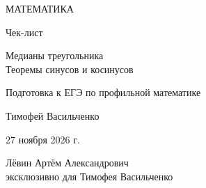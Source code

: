 \documentclass[a4paper,12pt]{article}
\begin{document}
\begin{titlepage}
\centering
\vspace*{27mm}
{\Large\color{darkaccent} МАТЕМАТИКА\par}
\vspace{14mm}
{\LARGE Чек-лист\par}
\vspace{10mm}
{\LARGE\color{accent} Медианы треугольника\\[3pt]Теоремы синусов и косинусов\par}
\vspace{15mm}
{\large Подготовка к ЕГЭ по профильной математике\par}
\vfill
{\large Тимофей Васильченко\par}
\vspace{9mm}
27 ноября 2026 г.\par
\vspace{15mm}
{\small Лёвин Артём Александрович\\эксклюзивно для Тимофея Васильченко\par}
\vspace{17mm}
\vspace{3mm}
\end{titlepage}
\setcounter{page}{1}
\end{document}
